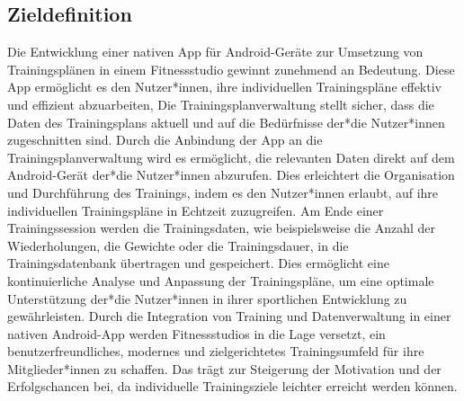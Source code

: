 \subsection{Zieldefinition}
Die Entwicklung einer nativen App für Android-Geräte zur Umsetzung von Trainingsplänen in einem Fitnessstudio gewinnt zunehmend an Bedeutung. Diese App ermöglicht es den Nutzer*innen, ihre individuellen Trainingspläne effektiv und effizient abzuarbeiten, 
\newline
\newline
Die Trainingsplanverwaltung stellt sicher, dass die Daten des Trainingsplans aktuell und auf die Bedürfnisse der*die Nutzer*innen zugeschnitten sind. Durch die Anbindung der App an die Trainingsplanverwaltung wird es ermöglicht, die relevanten Daten direkt auf dem Android-Gerät der*die Nutzer*innen abzurufen. Dies erleichtert die Organisation und Durchführung des Trainings, indem es den Nutzer*innen erlaubt, auf ihre individuellen Trainingspläne in Echtzeit zuzugreifen.
\newline
\newline
Am Ende einer Trainingssession werden die Trainingsdaten, wie beispielsweise die Anzahl der Wiederholungen, die Gewichte oder die Trainingsdauer, in die Trainingsdatenbank übertragen und gespeichert. Dies ermöglicht eine kontinuierliche Analyse und Anpassung der Trainingspläne, um eine optimale Unterstützung der*die Nutzer*innen in ihrer sportlichen Entwicklung zu gewährleisten.
\newline
\newline
Durch die Integration von Training und Datenverwaltung in einer nativen Android-App werden Fitnessstudios in die Lage versetzt, ein benutzerfreundliches, modernes und zielgerichtetes Trainingsumfeld für ihre Mitglieder*innen zu schaffen. Das trägt zur Steigerung der Motivation und der Erfolgschancen bei, da individuelle Trainingsziele leichter erreicht werden können.

\newpage
